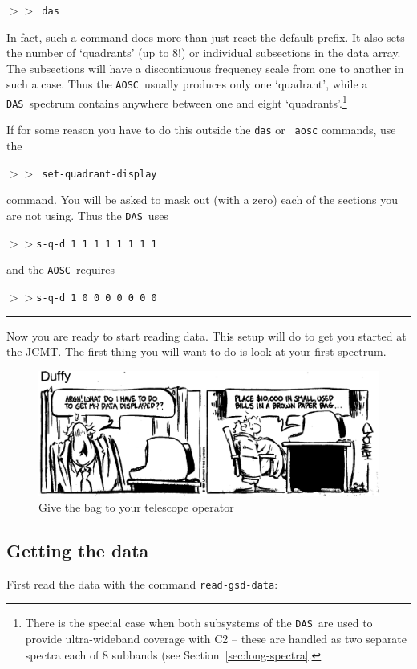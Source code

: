 \documentclass[11pt,twoside]{article}
\newcommand{\das}{{\tt DAS}}
\newcommand{\aosc}{{\tt AOSC}}
\newcommand{\SP}{{$>\!>$}}
\newcommand{\myline}
{\vspace*{-0.2in}\begin{center}\rule{3.0in}{0.015in}\end{center}}
\begin{document}
\SP\ {\tt das}

In fact, such a command does more than just reset the default prefix. It
also sets the number of `quadrants' (up to 8!) or individual subsections
in the data array. The subsections will have a discontinuous frequency
scale from one to another in such a case. Thus the \aosc\ usually produces
only one `quadrant', while a \das\ spectrum contains anywhere between one
and eight `quadrants'.\footnote{There is the special case when both
subsystems of the \das\ are used to provide ultra-wideband coverage with
C2 -- these are handled as two separate spectra each of 8 subbands (see
Section~\ref{sec:long-spectra}.}

If for some reason you have to do this outside the {\tt das} or {\tt
aosc} commands, use the

\SP\ {\tt set-quadrant-display} 

command. You will be asked to mask out (with a zero) each of the sections you 
are not using. Thus the \das\ uses

\SP {\tt s-q-d 1 1 1 1 1 1 1 1}

and the \aosc\ requires

\SP {\tt s-q-d 1 0 0 0 0 0 0 0}
\myline

Now you are ready to start reading data. This setup will do to get you
started at the JCMT. The first thing you will want to do is look at
your first spectrum.

\begin{figure}[htb]
\centering
\includegraphics[width=6.0in]{sc8_duffy.ps}
\vspace*{-0.5cm}
\begin{center}
\begin{minipage}[t]{5.5in}
\caption[Getting plots out]
{\small{Give the bag to your telescope operator}}
\label{fig:duffy}
\end{minipage}
\end{center}
\end{figure}

\subsection{Getting the data}
\label{sec:getting-the-data}
First read the data with the command {\tt read-gsd-data}:
\end{document}
